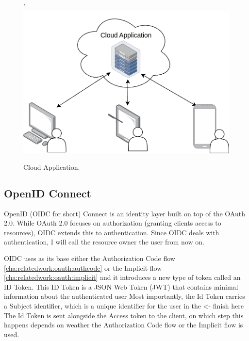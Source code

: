 \begin{figure}[H]
	\centering"
	\includegraphics[scale=0.4]{images/basic-cloud-services.drawio.png}
	\caption{Cloud Application.}
	\label{fig:oauth:authcodeflow}
\end{figure}

\subsection{OpenID Connect}
\label{cha:relatedwork:oauth:openid}


OpenID (OIDC for short) Connect is an identity layer built on top of the OAuth 2.0.
While OAuth 2.0 focuses on authorization (granting clients access to resources),
OIDC extends this to authentication.
Since OIDC deals with authentication, I will call the resource owner the user from now on.

OIDC uses as its base either the Authorization Code flow
\ref{cha:relatedwork:oauth:authcode} or the Implicit flow
\ref{cha:relatedwork:oauth:implicit} and
it introduces a new type of token called an ID Token.
This ID Token is a JSON Web Token (JWT) that contains minimal information about the authenticated
user
Most importantly, the Id Token carries a Subject identifier, which is a unique identifier
for the user in the <- finish here
The Id Token is sent alongside the Access token to the client, on which step this happens
depends on weather the Authorization Code flow or the Implicit flow is used.


%

